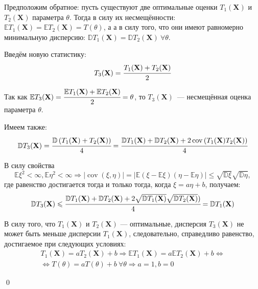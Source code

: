 \documentclass[oneside,final,14pt]{extreport}
\renewenvironment{proof}{{\bfseries Доказательство.}}{\qed}
\theoremstyle{plain}
\theoremstyle{definition}
\theoremstyle{named}
\begin{document}
\begin{proof}
Предположим обратное: пусть существуют две оптимальные оценки $T_1(\mathbf{X})$ и $T_2(\mathbf{X})$ параметра $\theta$. Тогда в силу их несмещённости: $\mathbb{E} T_{1}(\mathbf{X})=\mathbb{E} T_{2}(\mathbf{X})=T(\theta)$, а а в силу того, что они имеют равномерно минимальную дисперсию: $\mathbb{D} T_{1}(\mathbf{X})=\mathbb{D} T_{2}(\mathbf{X})~ \forall \theta$.

Введём новую статистику: 
\begin{equation}
    T_{3}(\mathbf{X})=\cfrac{T_{1}(\mathbf{X})+T_{2}(\mathbf{X})}{2}
\end{equation}

Так как $\mathbb{E} T_{3}(\mathbf{X})=\cfrac{\mathbb{E} T_{1}(\mathbf{X})+\mathbb{E} T_{2}(\mathbf{X})}{2}=\theta$, то $T_{3}(\mathbf{X})$~--- несмещённая оценка параметра $\theta$.

Имеем также:
\begin{equation*}
    \mathbb{D} T_{3}(\mathbf{X})=\cfrac{\mathbb{D}\left(T_{1}(\mathbf{X})+T_{2}(\mathbf{X})\right)}{4} =
    \cfrac{\mathbb{D} T_{1}(\mathbf{X})+\mathbb{D} T_{2}(\mathbf{X})+2 \operatorname{cov}\left(T_{1}(\mathbf{X}) T_{2}(\mathbf{X})\right)}{4}
\end{equation*}

В силу свойства
\begin{equation*}
    \mathbb{E} \xi^{2}<\infty, \mathbb{E} \eta^{2}<\infty \Rightarrow|\operatorname{cov}(\xi, \eta)| = | \mathbb{E}(\xi-\mathbb{E} \xi)(\eta-\mathbb{E} \eta)| \leqslant \sqrt{\mathbb{D} \xi} \sqrt{\mathbb{D} \eta},
\end{equation*}
где равенство достигается тогда и только тогда, когда $\xi=a \eta+b$, получаем:
\begin{equation*}
    \mathbb{D} T_{3}(\mathbf{X}) \leqslant \cfrac{\mathbb{D} T_{1}(\mathbf{X})+\mathbb{D} T_{2}(\mathbf{X})+2 \sqrt{\mathbb{D} T_{1}(\mathbf{X})} \sqrt{\mathbb{D} T_{2}(\mathbf{X})})}{4} =\mathbb{D} T_{1}(\mathbf{X})
\end{equation*}

В силу того, что $T_1(\mathbf{X})$ и $T_2(\mathbf{X})$ — оптимальные, дисперсия $T_3(\mathbf{X})$ не может быть меньше дисперсии $T_1(\mathbf{X})$, следовательно, справедливо равенство, достигаемое при следующих условиях:
\begin{equation*}
\begin{aligned}
    T_{1}(\mathbf{X})=a T_{2}(\mathbf{X})+b \Rightarrow \mathbb{E} T_{1}(\mathbf{X})
    = a \mathbb{E} T_{2}(\mathbf{X})+b 
    \Leftrightarrow \\
    \Leftrightarrow T(\theta) = a T(\theta)+b~ \forall \theta \Rightarrow a = 1, b = 0
\end{aligned}
\end{equation*}

\end{proof}
\end{document}
